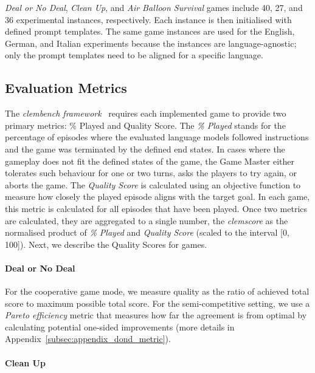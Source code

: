 \documentclass[11pt]{article}
\begin{document}
\textit{Deal or No Deal}, \textit{Clean Up}, and \textit{Air Balloon Survival} games include 40, 27, and 36 experimental instances, respectively. Each instance is then initialised with defined prompt templates. The same game instances are used for the English, German, and Italian experiments because the instances are language-agnostic; only the prompt templates need to be aligned for a specific language. 



\subsection{Evaluation Metrics}

The \textit{clembench framework}~\cite{chalamalasetti-etal-2023-clembench} requires each implemented game to provide two primary metrics: \% Played and Quality Score. The \textit{\% Played} stands for the percentage of episodes where the evaluated language models followed instructions and the game was terminated by the defined end states. In cases where the gameplay does not fit the defined states of the game, the Game Master either tolerates such behaviour for one or two turns, asks the players to try again, or aborts the game. The \textit{Quality Score} is calculated using an objective function to measure how closely the played episode aligns with the target goal. In each game, this metric is calculated for all episodes that have been played. Once two metrics are calculated, they are aggregated to a single number, the \textit{clemscore} as the normalised product of \textit{\% Played} and \textit{Quality Score} (scaled to the interval [0, 100]). Next, we describe the Quality Scores for games.

\paragraph{Deal or No Deal}

For the cooperative game mode, we measure quality as the ratio of achieved total score to maximum possible total score. For the semi-competitive setting, we use a \textit{Pareto efficiency} metric that measures how far the agreement is from optimal by calculating potential one-sided improvements (more details in Appendix~\ref{subsec:appendix_dond_metric}).

\paragraph{Clean Up}
\end{document}
